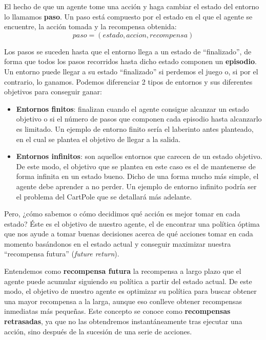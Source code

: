 
El hecho de que un agente tome una acción y haga cambiar el estado del entorno lo llamamos \textbf{paso}. Un paso está compuesto por el estado en el que el agente se encuentre, la acción tomada y la recompensa obtenida: $$paso = (estado, accion, recompensa)$$


Los pasos se suceden hasta que el entorno llega a un estado de “finalizado”, de forma que todos los pasos recorridos hasta dicho estado componen un \textbf{episodio}. Un entorno puede llegar a su estado “finalizado” si perdemos el juego o, si por el contrario, lo ganamos. Podemos diferenciar 2 tipos de entornos y sus diferentes objetivos para conseguir ganar:

\begin{itemize}
    \item \textbf{Entornos finitos}: finalizan cuando el agente consigue alcanzar un estado objetivo o si el número de pasos que componen cada episodio hasta alcanzarlo es limitado. Un ejemplo de entorno finito sería el laberinto antes planteado, en el cual se plantea el objetivo de llegar a la salida.
    \item \textbf{Entornos infinitos}: son aquellos entornos que carecen de un estado objetivo. De este modo, el objetivo que se plantea en este caso es el de mantenerse de forma infinita en un estado bueno. Dicho de una forma mucho más simple, el agente debe aprender a no perder. Un ejemplo de entorno infinito podría ser el problema del CartPole que se detallará más adelante.
\end{itemize}

Pero, ¿cómo sabemos o cómo decidimos qué acción es mejor tomar en cada estado? Éste es el objetivo de nuestro agente, el de encontrar una política óptima que nos ayude a tomar buenas decisiones acerca de qué acciones tomar en cada momento basándonos en el estado actual y conseguir maximizar nuestra “recompensa futura” (\textit{future return}).

Entendemos como \textbf{recompensa futura} la recompensa a largo plazo que el agente puede acumular siguiendo su política a partir del estado actual. De este modo, el objetivo de nuestro agente es optimizar su política para buscar obtener una mayor recompensa a la larga, aunque eso conlleve obtener recompensas inmediatas más pequeñas. Este concepto se conoce como \textbf{recompensas retrasadas}, ya que no las obtendremos instantáneamente tras ejecutar una acción, sino después de la sucesión de una serie de acciones.

